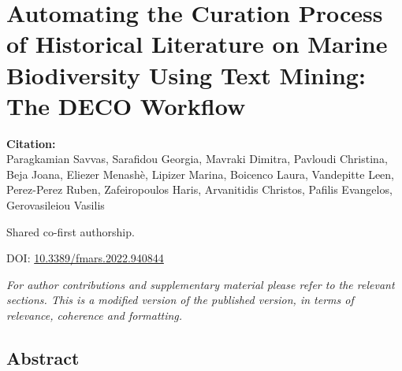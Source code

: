 % 
% 


\chapter{Automating the Curation Process of Historical Literature on Marine Biodiversity Using Text Mining: The DECO Workflow}
\label{cha:deco}


\textbf{Citation:} \\ 
Paragkamian Savvas, Sarafidou Georgia, Mavraki Dimitra, Pavloudi Christina,
Beja Joana, Eliezer Menashè, Lipizer Marina, Boicenco Laura, Vandepitte Leen,
Perez-Perez Ruben, Zafeiropoulos Haris, Arvanitidis Christos, Pafilis Evangelos, Gerovasileiou Vasilis

Shared co-first authorship.

DOI: \href{https://www.frontiersin.org/articles/10.3389/fmars.2022.940844}{10.3389/fmars.2022.940844}

\textit{For author contributions and supplementary material please refer 
    to the relevant sections. This is a modified version of the published 
    version, in terms of relevance, coherence and formatting.}


\section{Abstract}

